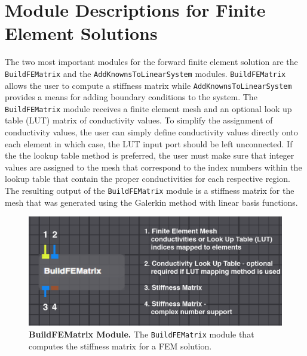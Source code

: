 \newpage

\section{Module Descriptions for Finite Element Solutions}

The two most important modules for the forward finite element solution are the {\tt BuildFEMatrix}
and the {\tt AddKnownsToLinearSystem} modules. {\tt BuildFEMatrix} allows the user to compute a stiffness matrix while {\tt AddKnownsToLinearSystem} provides a means for adding boundary conditions to the system.
The {\tt BuildFEMatrix} module receives a finite element mesh and an optional look up table (LUT) matrix of conductivity values.
To simplify the assignment of conductivity values, the user can simply define conductivity values directly onto each element in which case, the LUT input port should be left unconnected.
If the the lookup table method is preferred, the user must make sure that integer values are assigned to the mesh that correspond to the index numbers within the lookup table that contain the proper conductivities for each respective region.
The resulting output of the {\tt BuildFEMatrix} module is a stiffness matrix for the mesh that was generated using the Galerkin method with linear basis functions.

\begin{figure}[t]
\begin{center}
\includegraphics[width=.8\textwidth]{ECGToolkitGuide_figures/BuildFEMatrix.png}
\caption{{\bf BuildFEMatrix Module.} The {\tt BuildFEMatrix} module that computes the stiffness matrix for a FEM solution.}
\label{fig:FEM}
\end{center}
\end{figure}

